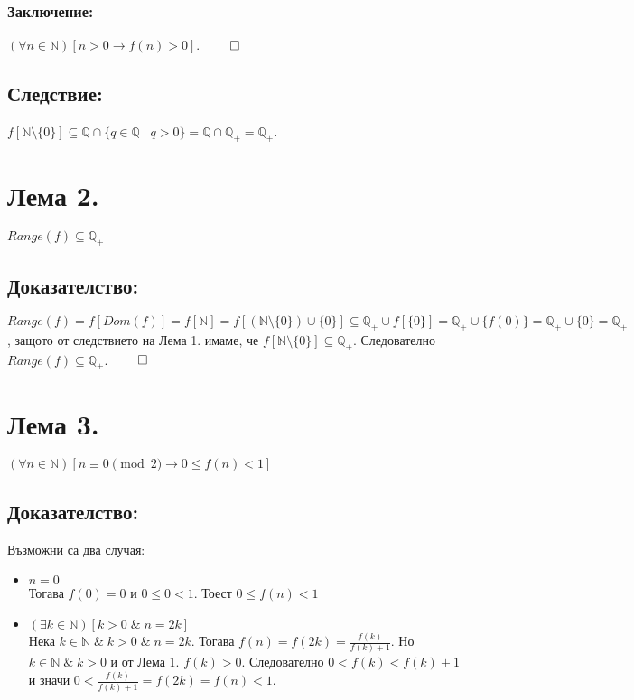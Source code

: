 \documentclass[a4paper, 12pt, oneside]{article}
\begin{document}
\subsubsection*{Заключение:}
\((\forall n \in \mathbb{N})[n > 0 \longrightarrow f(n) > 0]\). \(\qed\) \\
\subsection*{Следствие:}
\(f[\mathbb{N} \setminus \{0\}] \subseteq \mathbb{Q} \cap \{q \in \mathbb{Q} \; | \; q > 0\} = \mathbb{Q} \cap \mathbb{Q}_+ = \mathbb{Q}_+\).
\section*{Лема 2.}
\(Range(f) \subseteq \mathbb{Q}_+\)
\subsection*{Доказателство:}
\(Range(f) = f[Dom(f)] = f[\mathbb{N}] = f[(\mathbb{N} \setminus \{0\}) \cup \{0\}] \subseteq \mathbb{Q}_+ \cup f[\{0\}] = \mathbb{Q}_+ \cup \{f(0)\} = \mathbb{Q}_+ \cup \{0\} = \mathbb{Q}_+\),
защото от следствието на Лема 1. имаме, че \(f[\mathbb{N} \setminus \{0\}] \subseteq \mathbb{Q}_+\).
Следователно \(Range(f) \subseteq \mathbb{Q}_+\). \(\qed\)
\section*{Лема 3.}
\((\forall n \in \mathbb{N})[n \equiv 0 \pmod{2} \longrightarrow 0 \leq f(n) < 1]\)
\subsection*{Доказателство:}
Възможни са два случая:
\begin{itemize}
    \item \(n = 0\) \\
    Тогава \(f(0) = 0\) и \(0 \leq 0 < 1\). Тоест \(0 \leq f(n) < 1\)
    \item \((\exists k \in \mathbb{N})[k > 0 \; \& \; n = 2k]\) \\
    Нека \(k \in \mathbb{N} \; \& \; k > 0 \; \& \; n = 2k\).
    Тогава \(f(n) = f(2k) = \displaystyle\frac{f(k)}{f(k) + 1}\).
    Но \(k \in \mathbb{N} \; \& \; k > 0\) и от Лема 1. \(f(k) > 0\).
    Следователно \(0 < f(k) < f(k) + 1\) и значи \(0 < \displaystyle\frac{f(k)}{f(k) + 1} = f(2k) = f(n) < 1\).
\end{itemize}
\end{document}
